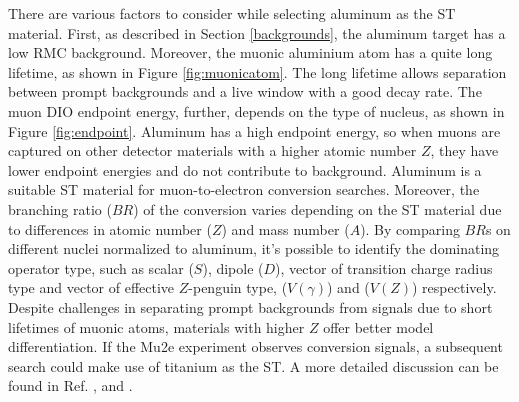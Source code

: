 There are various factors to consider while selecting aluminum as the ST material. 
First, as described in Section \ref{backgrounds}, the aluminum 
target has a low RMC background. Moreover, the muonic aluminium 
atom has a quite long lifetime, as shown in Figure \ref{fig:muonicatom}. 
The long lifetime allows separation between prompt backgrounds and a 
live window with a good decay rate. The muon DIO endpoint energy, 
further, depends on the type of nucleus, as shown in Figure \ref{fig:endpoint}. 
Aluminum has a high endpoint energy, so when muons are captured on other 
detector materials with a higher atomic number $Z$, they have lower 
endpoint energies and do not contribute to background. Aluminum is a 
suitable ST material for muon-to-electron conversion searches.
Moreover, the branching ratio ($BR$) of the conversion varies 
depending on the ST material due to differences in atomic number 
($Z$) and mass number ($A$). By comparing $BR$s on different nuclei 
normalized to aluminum, it's possible to identify the dominating 
operator type, such as scalar ($S$), dipole ($D$), vector of 
transition charge radius type and vector of effective $Z$-penguin type, 
($V(\gamma)$) and ($V(Z)$) respectively. 
Despite challenges in separating prompt backgrounds from 
signals due to short lifetimes of muonic atoms, 
materials with higher $Z$ offer better model differentiation. 
If the Mu2e experiment observes conversion signals, a subsequent search 
could make use of titanium as the ST. A more detailed discussion can be 
found in Ref. \cite{PhysRevD.80.013002}, \cite{PhysRevD.76.059902} and 
\cite{abusalma2018expression}.


